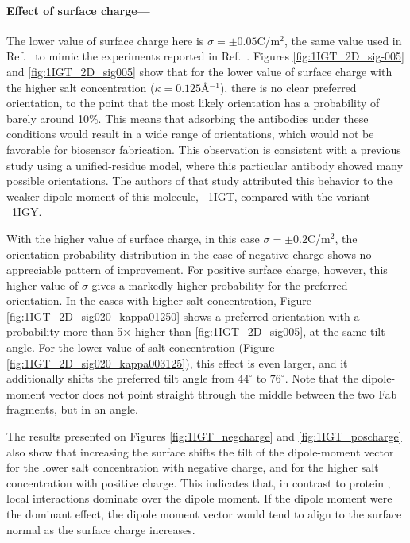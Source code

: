  \medskip
 
 \paragraph*{Effect of surface charge---}
 
The lower value of surface charge here is $\sigma=\pm 0.05$C/m$^2$, the same value used in Ref.~ to mimic the experiments reported in Ref.~. Figures \ref{fig:1IGT_2D_sig-005} and \ref{fig:1IGT_2D_sig005} show that for the lower value of surface charge with the higher salt concentration ($\kappa=0.125$\AA$^{-1}$), there is no clear preferred orientation, to the point that the most likely orientation has a probability of barely around 10\%. This means that adsorbing the antibodies under these conditions would result in a wide range of orientations, which would not be favorable for biosensor fabrication. This observation is consistent with a previous study using a unified-residue model,\cite{ZhouChenJiang2003} where this particular antibody showed many possible orientations. The authors of that study attributed this behavior to the weaker dipole moment of this molecule, \pdb\ {\small 1IGT}, compared with the variant \pdb\ {\small 1IGY}.
 
 With the higher value of surface charge, in this case $\sigma=\pm0.2$C/m$^2$, the orientation probability distribution in the case of negative charge shows no appreciable pattern of improvement.
 For positive surface charge, however, this higher value of $\sigma$ gives a markedly higher probability for the preferred orientation.
In the cases with higher salt concentration, Figure \ref{fig:1IGT_2D_sig020_kappa01250} shows a preferred orientation with a probability more than 5$\times$ higher than \ref{fig:1IGT_2D_sig005}, at the same tilt angle. For the lower value of salt concentration (Figure \ref{fig:1IGT_2D_sig020_kappa003125}), this effect is even larger, and it additionally shifts the preferred tilt angle from $44^{\circ}$ to $76^{\circ}$. Note that the dipole-moment vector does not point straight through the middle between the two Fab fragments, but in an angle.
 
The results presented on Figures \ref{fig:1IGT_negcharge} and \ref{fig:1IGT_poscharge} also show that increasing the surface shifts the tilt of the dipole-moment vector for the lower salt concentration with negative charge, and for the higher salt concentration with positive charge. This indicates that, in contrast to protein \gb, local interactions dominate over the dipole moment. If the dipole moment were the dominant effect, the dipole moment vector would tend to align to the surface normal as the surface charge increases.
 
